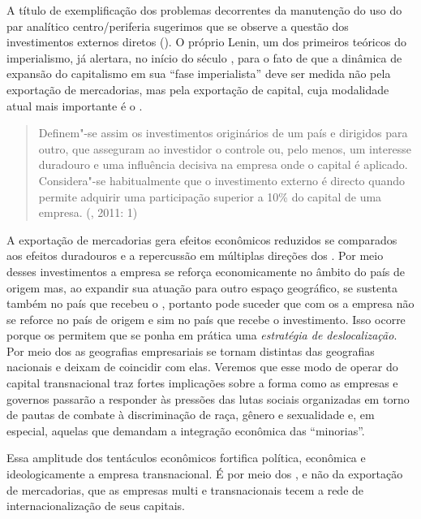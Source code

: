 A título de exemplificação dos problemas decorrentes da manutenção do
uso do par analítico centro/periferia sugerimos que se observe a questão
dos investimentos externos diretos (). O próprio Lenin, um dos
primeiros teóricos do imperialismo, já alertara, no início do século ,
para o fato de que a dinâmica de expansão do capitalismo em sua ``fase
imperialista'' deve ser medida não pela exportação de mercadorias, mas
pela exportação de capital, cuja modalidade atual mais importante é o
.

\begin{quote}
Definem"-se assim os investimentos originários de um país e dirigidos
para outro, que asseguram ao investidor o controle ou, pelo menos, um
interesse duradouro e uma influência decisiva na empresa onde o capital
é aplicado. Considera"-se habitualmente que o investimento externo é
directo quando permite adquirir uma participação superior a 10\% do
capital de uma empresa. (, 2011: 1)
\end{quote}

A exportação de mercadorias gera efeitos econômicos reduzidos se
comparados aos efeitos duradouros e a repercussão em múltiplas direções
dos . Por meio desses investimentos a empresa se reforça
economicamente no âmbito do país de origem mas, ao expandir sua atuação
para outro espaço geográfico, se sustenta também no país que recebeu o
, portanto pode suceder que com os  a empresa não se reforce no
país de origem e sim no país que recebe o investimento. Isso ocorre
porque os  permitem que se ponha em prática uma \emph{estratégia de
deslocalização}. Por meio dos  as geografias empresariais se tornam
distintas das geografias nacionais e deixam de coincidir com elas.
Veremos que esse modo de operar do capital transnacional traz fortes
implicações sobre a forma como as empresas e governos passarão a
responder às pressões das lutas sociais organizadas em torno de pautas
de combate à discriminação de raça, gênero e sexualidade e, em especial,
aquelas que demandam a integração econômica das ``minorias''.

Essa amplitude dos tentáculos econômicos fortifica política, econômica e
ideologicamente a empresa transnacional. É por meio dos , e não da
exportação de mercadorias, que as empresas multi e transnacionais tecem
a rede de internacionalização de seus capitais.

